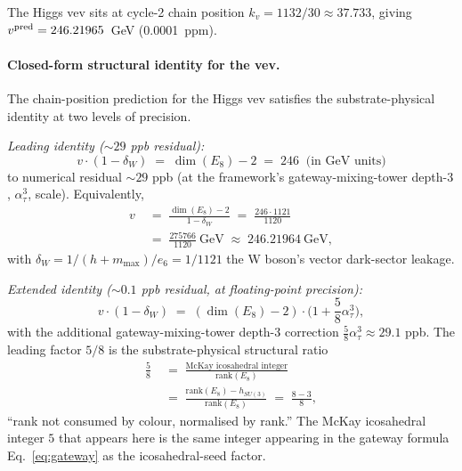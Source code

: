 ﻿\documentclass[reprint,amsmath,amssymb,aps,prd,longbibliography,floatfix]{revtex4-2}
\begin{document}
The Higgs vev sits at cycle-2 chain position $k_v = 1132/30 \approx 37.733$,
giving $v^{\rm pred} = 246.21965$~GeV (\SI{0.0001}{ppm}).

\paragraph{Closed-form structural identity for the vev.}
The chain-position prediction for the Higgs vev satisfies the
substrate-physical identity at two levels of precision.

\emph{Leading identity ($\sim 29$ ppb residual):}
\begin{equation}
\boxed{v \cdot (1 - \delta_W) \;=\; \dim(E_8) - 2 \;=\; 246 \;\; \text{(in GeV units)}}
\label{eq:v-structural-identity}
\end{equation}
to numerical residual $\sim 29$ ppb (at the framework's
gateway-mixing-tower depth-$3$, $\alpha_\tau^3$, scale). Equivalently,
\begin{equation}
\begin{aligned}
v \;&=\; \frac{\dim(E_8) - 2}{1 - \delta_W} \;=\; \frac{246 \cdot 1121}{1120} \\
   \;&=\; \frac{275766}{1120}~\text{GeV} \;\approx\; 246.21964~\text{GeV},
\end{aligned}
\label{eq:v-identity-form}
\end{equation}
with $\delta_W = 1/(h+m_{\max})/e_6 = 1/1121$ the W boson's vector
dark-sector leakage.

\emph{Extended identity ($\sim 0.1$ ppb residual, at floating-point precision):}
\begin{equation}
v \cdot (1 - \delta_W) \;=\; (\dim(E_8) - 2) \cdot \biggl(1 + \frac{5}{8}\alpha_\tau^3\biggr),
\label{eq:v-identity-extended}
\end{equation}
with the additional gateway-mixing-tower depth-$3$ correction
$\frac{5}{8}\alpha_\tau^3 \approx 29.1$ ppb. The leading factor $5/8$
is the substrate-physical structural ratio
\begin{equation}
\begin{aligned}
\frac{5}{8} \;&=\; \frac{\text{McKay icosahedral integer}}{\text{rank}(E_8)} \\
            \;&=\; \frac{\text{rank}(E_8) - h_{SU(3)}}{\text{rank}(E_8)} \;=\; \frac{8-3}{8},
\end{aligned}
\label{eq:5-over-8}
\end{equation}
``rank not consumed by colour, normalised by rank.'' The McKay
icosahedral integer $5$ that appears here is the same integer
appearing in the gateway formula
Eq.~\eqref{eq:gateway} as the icosahedral-seed factor.
\end{document}
